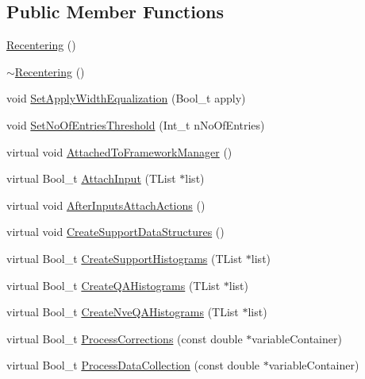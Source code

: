 \subsection*{Public Member Functions}
\begin{DoxyCompactItemize}
\item 
\mbox{\hyperlink{classQn_1_1Recentering_a6829d3d68b7eb2be8d2ae7e3f5b5e7a8}{Recentering}} ()
\item 
\mbox{\hyperlink{classQn_1_1Recentering_aa8615dd4cbcbc96f31b6db194b976e34}{$\sim$\+Recentering}} ()
\item 
void \mbox{\hyperlink{classQn_1_1Recentering_aec92eae9a164c6bb97f50edb7ba3bff6}{Set\+Apply\+Width\+Equalization}} (Bool\+\_\+t apply)
\item 
void \mbox{\hyperlink{classQn_1_1Recentering_ab9c1d5914e7e8007bbd7039ef5430d3d}{Set\+No\+Of\+Entries\+Threshold}} (Int\+\_\+t n\+No\+Of\+Entries)
\item 
virtual void \mbox{\hyperlink{classQn_1_1Recentering_aa51bf50f4a003ac79e7d8c669b1efdac}{Attached\+To\+Framework\+Manager}} ()
\item 
virtual Bool\+\_\+t \mbox{\hyperlink{classQn_1_1Recentering_ae931dc184caefa05392992a15ae5b53f}{Attach\+Input}} (T\+List $\ast$list)
\item 
virtual void \mbox{\hyperlink{classQn_1_1Recentering_afce97632b1a2cc9ecf49a4f4768601dc}{After\+Inputs\+Attach\+Actions}} ()
\item 
virtual void \mbox{\hyperlink{classQn_1_1Recentering_a6aa8507e24f482af1d7fdd55151b3d34}{Create\+Support\+Data\+Structures}} ()
\item 
virtual Bool\+\_\+t \mbox{\hyperlink{classQn_1_1Recentering_accf0f1282e35bd0a94a2d93312ff6ad5}{Create\+Support\+Histograms}} (T\+List $\ast$list)
\item 
virtual Bool\+\_\+t \mbox{\hyperlink{classQn_1_1Recentering_a2edebcd0303549d8ca342fdeb913046b}{Create\+Q\+A\+Histograms}} (T\+List $\ast$list)
\item 
virtual Bool\+\_\+t \mbox{\hyperlink{classQn_1_1Recentering_a79b742c62efee3462e65cad7089b1b54}{Create\+Nve\+Q\+A\+Histograms}} (T\+List $\ast$list)
\item 
virtual Bool\+\_\+t \mbox{\hyperlink{classQn_1_1Recentering_a78bd432f4eb1f13cf846176426dbe579}{Process\+Corrections}} (const double $\ast$variable\+Container)
\item 
virtual Bool\+\_\+t \mbox{\hyperlink{classQn_1_1Recentering_a1e3efc8b261021b21732474eb7afa3ca}{Process\+Data\+Collection}} (const double $\ast$variable\+Container)

\end{DoxyCompactItemize}
